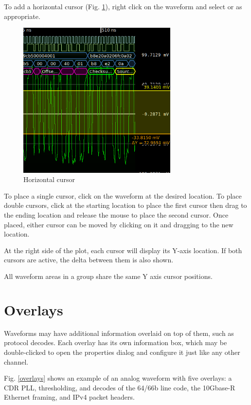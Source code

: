 To add a horizontal cursor (Fig. \ref{horizontal-cursor}), right click on the waveform and select  or  as appropriate.

\begin{figure}[H]
\centering
\includegraphics[width=8cm]{images/horizontal-cursor.png}
\caption{Horizontal cursor}
\label{horizontal-cursor}
\end{figure}

To place a single cursor, click on the waveform at the desired location. To place double cursors, click at the starting
location to place the first cursor then drag to the ending location and release the mouse to place the second cursor.
Once placed, either cursor can be moved by clicking on it and dragging to the new location.

At the right side of the plot, each cursor will display its Y-axis location. If both cursors are active, the delta
between them is also shown.

All waveform areas in a group share the same Y axis cursor positions.

\section{Overlays}

Waveforms may have additional information overlaid on top of them, such as protocol decodes. Each overlay has its own
information box, which may be double-clicked to open the properties dialog and configure it just like any other
channel.

Fig. \ref{overlays} shows an example of an analog waveform with five overlays: a CDR PLL, thresholding, and decodes of
the 64/66b line code, the 10Gbase-R Ethernet framing, and IPv4 packet headers.

